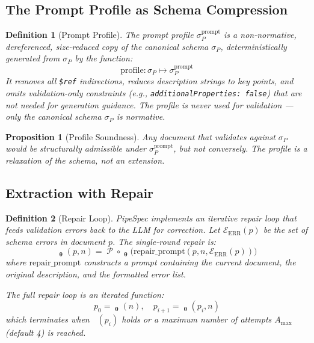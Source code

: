 \documentclass[11pt,a4paper]{article}
\newtheorem{definition}{Definition}[section]
\newtheorem{proposition}{Proposition}[section]
\theoremstyle{definition}
\DeclareMathOperator{\ExtractLLM}{\mathcal{E}_{\bm\theta}}
\DeclareMathOperator{\ExtractRaw}{\mathcal{E}^{\text{raw}}_{\bm\theta}}
\DeclareMathOperator{\ParseLLM}{\mathcal{P}}
\DeclareMathOperator{\ValidateSchemaP}{\mathcal{V}_S}
\DeclareMathOperator{\RepairLLM}{\mathcal{R}_{\bm\theta}}
\newcommand{\errs}{\mathcal{E}_{\text{ERR}}}
\begin{document}
\subsection{The Prompt Profile as Schema Compression}
\begin{definition}[Prompt Profile]
The \emph{prompt profile} $\sigma_P^{\text{prompt}}$ is a non-normative, dereferenced, size-reduced copy of the canonical schema $\sigma_P$, deterministically generated from $\sigma_P$ by the function:
\begin{equation}
\text{profile} : \sigma_P \mapsto \sigma_P^{\text{prompt}}
\end{equation}
It removes all \texttt{\$ref} indirections, reduces description strings to key points, and omits validation-only constraints (e.g., \texttt{additionalProperties: false}) that are not needed for generation guidance. The profile is \emph{never} used for validation — only the canonical schema $\sigma_P$ is normative.
\end{definition}

\begin{proposition}[Profile Soundness]
Any document that validates against $\sigma_P$ would be structurally admissible under $\sigma_P^{\text{prompt}}$, but not conversely. The profile is a \emph{relaxation} of the schema, not an extension.
\end{proposition}

\subsection{Extraction with Repair}
\begin{definition}[Repair Loop]
PipeSpec implements an \emph{iterative repair loop} that feeds validation errors back to the LLM for correction. Let $\errs(p)$ be the set of schema errors in document $p$. The \emph{single-round repair} is:
\begin{equation}
\RepairLLM_{\bm\theta}(p, n) = \ParseLLM \circ \ExtractRaw_{\bm\theta}\big(\text{repair\_prompt}(p, n, \errs(p))\big)
\end{equation}
where $\text{repair\_prompt}$ constructs a prompt containing the current document, the original description, and the formatted error list.

The full repair loop is an iterated function:
\begin{equation}
p_0 = \ExtractLLM_{\bm\theta}(n), \quad p_{i+1} = \RepairLLM_{\bm\theta}(p_i, n)
\end{equation}
which terminates when $\ValidateSchemaP(p_i)$ holds or a maximum number of attempts $A_{\max}$ (default 4) is reached.
\end{definition}
\end{document}
